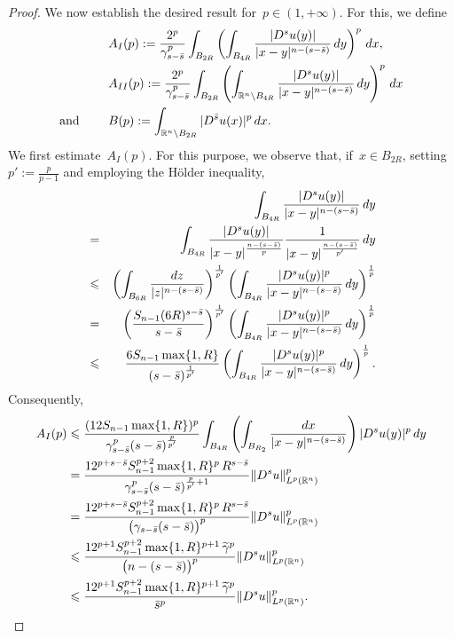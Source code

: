 \documentclass[10pt,a4paper]{amsart}
\newcommand{\R}{\mathbb{R}}
\newcommand{\bs}{\Bar{s}}
\renewcommand{\le}{\leqslant}
\renewcommand{\leq}{\leqslant}
\begin{document}
\begin{proof}
			We now establish the desired result for~$p \in (1, +\infty)$.
			For this, we define
			\begin{align*}
			&A_{I}(p):= \frac{2^p}{\gamma^p_{s-\bs}} \int_{B_{2R}} \left( \int_{B_{4R}} \frac{|D^su(y)|}{|x-y|^{n-(s-\bs)}} \, dy\right)^p \, dx,  \\
			&A_{II}(p):= \frac{2^p}{\gamma^p_{s-\bs}} \int_{B_{2R}} \left (\int_{\R^n \setminus B_{4R}} \frac{|D^su(y)|}{|x-y|^{n-(s-\bs)}} \, dy\right)^p \, dx \\ {\mbox{and }} \qquad
			&B(p):= \int_{\R^n \setminus B_{2R}} |D^{\bs}u(x)|^p \, dx.
			\end{align*}
			We first estimate~$A_I(p)$. For this purpose, we observe that, if~$x \in B_{2R}$, setting~$p':=\frac{p}{p-1}$ and employing the H\"older inequality,
			\begin{eqnarray*}&&
				\int_{B_{4R}} \frac{|D^su(y)|}{|x-y|^{n-(s-\bs)}} \, dy\\& =&
				 \int_{B_{4R}} \frac{|D^su(y)|}{|x-y|^{\frac{n-(s-\bs)}{p}}} \frac{1}{|x-y|^{\frac{n-(s-\bs)}{p'}}} \, dy  \\ 
				 &\leq&  \left(\int_{B_{6R}} \frac{dz}{|z|^{n-(s-\bs)}} \right)^{\frac{1}{p'}} \left(\int_{B_{4R}} \frac{|D^s u(y)|^p}{|x-y|^{n-(s-\bs)}} \, dy \right)^{\frac{1}{p}}
				  \\ &= &\left( \frac{ S_{n-1} (6R)^{s-\bar{s}}}{s-\bs}\right)^{\frac{1}{p'}} \left(\int_{B_{4R}} \frac{|D^s u(y)|^p}{|x-y|^{n-(s-\bs)}} \, dy \right)^{\frac{1}{p}}  
\\ &\le &
\frac{ 6S_{n-1} \max\{1,R\} }{(s - \bar{s})^{\frac{1}{p'}}} \left(\int_{B_{4R}} \frac{|D^s u(y)|^p}{|x-y|^{n-(s-\bs)}} \, dy \right)^{\frac{1}{p}}. 
\end{eqnarray*}
Consequently, 
\begin{equation*}\begin{split}
A_I(p)& \leq \frac{(12 S_{n-1} \max\{1,R\})^p}{\gamma^p_{s-\bs}(s-\bs)^{\frac{p}{p'}}} \int_{B_{4R}} \left(\int_{B_{R_2}} \frac{dx}{|x-y|^{n-(s-\bs)}}  \right) |D^s u(y)|^p\, dy \\ &
=\frac{12^{p+s-\bar{s}} S_{n-1}^{p+2} \max\{1,R\}^p\,R^{s-\bar s}}{\gamma^p_{s-\bs}(s-\bs)^{\frac{p}{p'}+1}}  \Vert D^s u \Vert^p_{L^p(\R^n)}
\\&=\frac{12^{p+s-\bar{s}} S_{n-1}^{p+2} \max\{1,R\}^p\,R^{s-\bar s}}{\big(\gamma_{s-\bs}(s-\bs)\big)^p} \Vert D^s u \Vert^p_{L^p(\R^n)}\\&
\le\frac{12^{p+1} S_{n-1}^{p+2} \max\{1,R\}^{p+1}\,\widetilde\gamma^p}{\big(n-(s-\bar s)\big)^p} \Vert D^s u \Vert^p_{L^p(\R^n)}\\&\le
\frac{12^{p+1} S_{n-1}^{p+2} \max\{1,R\}^{p+1}\,\widetilde\gamma^p}{\bar{s}^p} \Vert D^s u \Vert^p_{L^p(\R^n)}
.
			\end{split}\end{equation*}
			

\end{proof}
\end{document}
